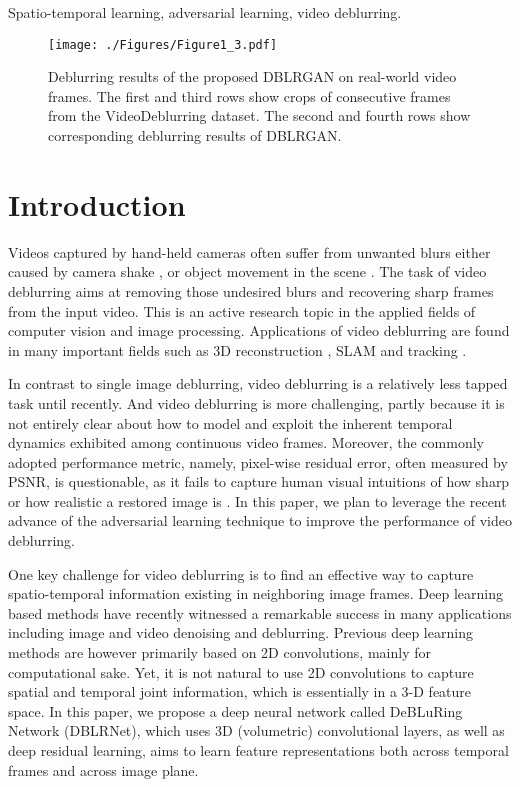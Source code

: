 \documentclass[journal]{IEEEtran}
\begin{document}
\begin{IEEEkeywords}
Spatio-temporal learning, adversarial learning, video deblurring.
\end{IEEEkeywords}






\IEEEpeerreviewmaketitle


\begin{figure*}[tb]
\centering
\texttt{[image: ./Figures/Figure1\_3.pdf]}
\caption{Deblurring results of the proposed DBLRGAN on real-world video frames. The first and third rows show crops of consecutive frames from the VideoDeblurring dataset. The second and fourth rows show corresponding deblurring results of DBLRGAN. }
\label{figure1}
\end{figure*}

\section{Introduction}

Videos captured by hand-held cameras often suffer from unwanted blurs either caused by camera shake \cite{kang2007automatic}, or object movement in the scene \cite{sun2015learning,shi2015just}. The task of video deblurring aims at removing those undesired blurs and recovering sharp frames from the input video. This is an active research topic in the applied fields of computer vision and image processing.  Applications of video deblurring are found in many important fields such as 3D reconstruction \cite{seok2013dense}, SLAM \cite{lee2011simultaneous} and tracking \cite{jin2005visual}.

In contrast to single image deblurring, video deblurring is a relatively less tapped task until recently.  And video deblurring is more challenging, partly because  it is not entirely clear about how to model and exploit the inherent temporal dynamics exhibited among continuous video frames. Moreover, the commonly adopted performance metric, namely, pixel-wise residual error, often measured by PSNR, is questionable, as it fails to capture human visual intuitions of how sharp or how realistic a restored image is  \cite{wang2003multiscale,wang2004image}.  In this paper, we plan to leverage the recent advance of the adversarial learning technique to improve the performance of video deblurring.


One key challenge for video deblurring is to find an effective way to capture spatio-temporal information existing in neighboring image frames. Deep learning based methods have recently witnessed a remarkable success in many applications including image and video denoising and deblurring. Previous deep learning methods are however primarily based on 2D convolutions, mainly for computational sake. Yet, it is not natural to use 2D convolutions to capture spatial and temporal joint information, which is essentially in a 3-D feature space. In this paper, we propose a deep neural network called DeBLuRing Network (DBLRNet), which uses 3D (volumetric) convolutional layers, as well as deep residual learning, aims to learn feature representations both across temporal frames and across image plane.
\end{document}
